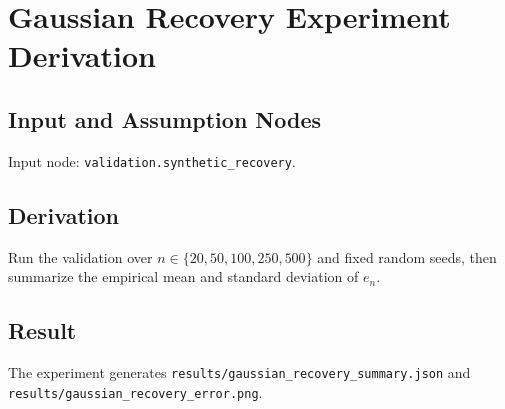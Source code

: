 \section{Gaussian Recovery Experiment Derivation}
\label{experiment:gaussian-recovery}

\subsection{Input and Assumption Nodes}
Input node: \texttt{validation.synthetic\_recovery}.

\subsection{Derivation}
Run the validation over \(n\in\{20,50,100,250,500\}\) and fixed random seeds, then summarize the empirical mean and standard deviation of \(e_n\).

\subsection{Result}
The experiment generates \texttt{results/gaussian\_recovery\_summary.json} and \texttt{results/gaussian\_recovery\_error.png}.


